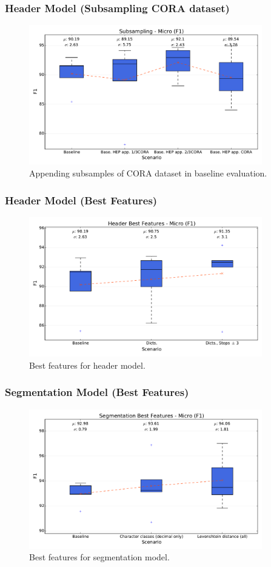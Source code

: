 \documentclass{beamer}
\begin{document}

\begin{frame}
\frametitle{Header Model (Subsampling CORA dataset)}
\begin{figure}[h]
\center
\includegraphics[width=4in]{Figures/micro_subsampling.pdf}
\caption{Appending subsamples of CORA dataset in baseline evaluation.}
\end{figure}
\end{frame}


\begin{frame}
\frametitle{Header Model (Best Features)}
\begin{figure}[h]
\center
\includegraphics[width=4in]{Figures/micro_header.pdf}
\caption{Best features for header model.}
\end{figure}
\end{frame}


\begin{frame}
\frametitle{Segmentation Model (Best Features)}
\begin{figure}[h]
\center
\includegraphics[width=4in]{Figures/micro_segmentation.pdf}
\caption{Best features for segmentation model.}
\end{figure}
\end{frame}
\end{document}
